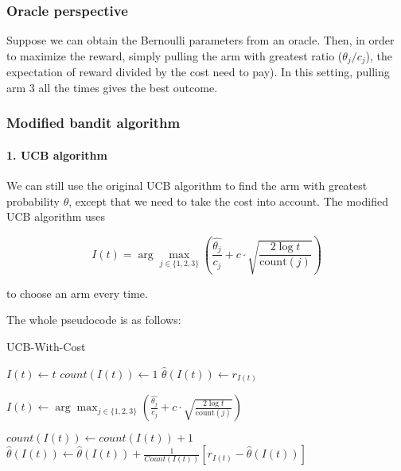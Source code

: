 \documentclass[11pt]{article}
\begin{document}
\hypertarget{oracle-perspective}{%
\subsubsection{Oracle perspective}\label{oracle-perspective}}

Suppose we can obtain the Bernoulli parameters from an oracle. Then, in
order to maximize the reward, simply pulling the arm with greatest ratio
(\(\theta_j / c_j\)), the expectation of reward divided by the cost need
to pay). In this setting, pulling arm 3 all the times gives the best
outcome.

\hypertarget{modified-bandit-algorithm}{%
\subsubsection{Modified bandit
algorithm}\label{modified-bandit-algorithm}}

\hypertarget{ucb-algorithm}{%
\paragraph{1. UCB algorithm}\label{ucb-algorithm}}



We can still use the original UCB algorithm to find the arm with
greatest probability \(\theta\), except that we need to take the cost
into account. The modified UCB algorithm uses

\[
    I(t) = \arg\max_{j\in \{1,2,3\}} \left( \frac{\hat{\theta_j}}{c_j} + c\cdot \sqrt{\frac{2\log t}{\mathrm{count}(j)}} \right)
\]

to choose an arm every time.

The whole pseudocode is as follows:

\begin{minipage}{10cm}
    \begin{algorithm}[H]
        \caption{UCB-With-Cost}
        \begin{algorithmic}[1]
                \State $I(t) \leftarrow t$
                \State $count(I(t)) \leftarrow 1$
                \State $\hat{\theta}(I(t))\leftarrow r_{I(t)}$
            \EndFor
                
                \State $I(t) \leftarrow\arg\max_{j\in \{1,2,3\}} \left( \frac{\hat{\theta_j}}{c_j} + c\cdot \sqrt{\frac{2\log t}{\mathrm{count}(j)}} \right)$

                \State $count(I(t))\leftarrow count(I(t)) + 1$
                \State $\hat{\theta}(I(t)) \leftarrow \hat{\theta}(I(t))  + \frac{1}{Count(I(t))}\left[
                        r_{I(t)} - \hat{\theta}(I(t))
                    \right]$
            \EndFor
        \end{algorithmic}
    \end{algorithm}
    \end{minipage}
\end{document}
